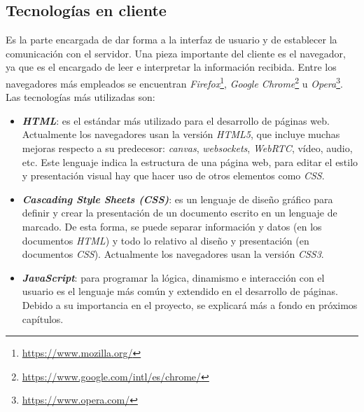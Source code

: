 \subsection{Tecnologías en cliente}
\label{subsec:tecclient}
Es la parte encargada de dar forma a la interfaz de usuario y de establecer la comunicación con el servidor. Una pieza importante del cliente es el navegador, ya que es el encargado de leer e interpretar la información recibida. Entre los navegadores más empleados se encuentran \textit{Firefox}\footnote{\url{https://www.mozilla.org/}}, \textit{Google Chrome}\footnote{\url{https://www.google.com/intl/es/chrome/}} u \textit{Opera}\footnote{\url{https://www.opera.com/}}. Las tecnologías más utilizadas son: 
\begin{itemize}
    \item \textit{\textbf{HTML}}: es el estándar más utilizado para el desarrollo de páginas web. Actualmente los navegadores usan la versión \textit{HTML5}, que incluye muchas mejoras respecto a su predecesor: \textit{canvas}, \textit{websockets}, \textit{WebRTC}, vídeo, audio, etc. Este lenguaje indica la estructura de una página web, para editar el estilo y presentación visual hay que hacer uso de otros elementos como \textit{CSS}.
    \item \textit{\textbf{Cascading Style Sheets (CSS)}}:  es un lenguaje de diseño gráfico para definir y crear la presentación de un documento escrito en un lenguaje de marcado. De esta forma, se puede separar información y datos (en los documentos \textit{HTML}) y todo lo relativo al diseño y presentación (en documentos \textit{CSS}). Actualmente los navegadores usan la versión \textit{CSS3}.
    \item \textit{\textbf{JavaScript}}: para programar la lógica, dinamismo e interacción con el usuario es el lenguaje más común y extendido en el desarrollo de páginas. Debido a su importancia en el proyecto, se explicará más a fondo en próximos capítulos. 
\end{itemize}

